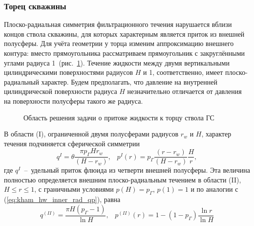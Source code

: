 \documentclass{article}
\begin{document}
\subsubsection{Торец скважины}
Плоско-радиальная симметрия фильтрационного течения нарушается вблизи концов ствола скважины, для которых характерным является приток из внешней полусферы.
Для учёта геометрии у торца изменим аппроксимацию внешнего контура: вместо
прямоугольника рассматриваем прямоугольник с закруглёнными углами
радиуса 1~(рис.~\ref{fig:kham_well_end_sch}).
Течение жидкости между двумя вертикальными цилиндрическими поверхностями радиусов $H$ и 1, соответственно, имеет плоско-радиальный характер. Будем предполагать, что давление на внутренней цилиндрической поверхности радиуса $H$ незначительно отличается от давления на поверхности полусферы такого же радиуса.

\begin{figure}[!ht]
\centering

\caption{Область решения задачи о притоке жидкости к торцу ствола ГС}
\label{fig:kham_well_end_sch}
\end{figure}

В области (I), ограниченной двумя полусферами радиусов $r_w$ и $H$, характер течения подчиняется сферической симметрии
\begin{equation}
\displaystyle
q^I = \theta \dfrac{\pi p_{\Gamma} H r_w}{\left(H - r_w\right)} , \;\;\;
p^I(r) = p_{\Gamma}\dfrac{\left(r-r_w\right)}{\left(H-r_w\right)}\dfrac{H}{r},
\label{eq:kham_hw_outer_spheric}
\end{equation}
где $q^I$~--~удельный приток флюида из четверти внешней полусферы. Эта величина полностью определяется внешним плоско-радиальным течением в области (II), $H \le r \le 1$, с граничными условиями $p(H) = p_{\Gamma}$, $p(1)= 1$ и по аналогии с (\ref{eq:kham_hw_inner_rad_qp}), равна
\begin{equation}
\displaystyle
q^{(II)} = \dfrac{\pi H \left( p_{\Gamma} - 1 \right)}{ \ln{H }}, \;\;\;
p^{(II)}(r) = 1 - \left(1-p_{\Gamma}\right) \dfrac{\ln{r}}{\ln{H}}
\label{eq:kham_hw_outer_cyl}
\end{equation}
\end{document}
